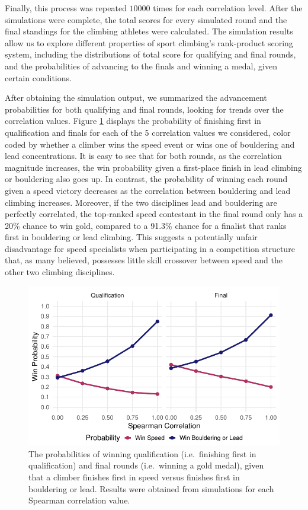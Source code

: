 \documentclass[letterpaper, inpress]{jds} %
\begin{document}
Finally, this process was repeated \(10000\) times for each correlation
level. After the simulations were complete, the total scores for every
simulated round and the final standings for the climbing athletes were
calculated. The simulation results allow us to explore different
properties of sport climbing's rank-product scoring system, including
the distributions of total score for qualifying and final rounds, and
the probabilities of advancing to the finals and winning a medal, given
certain conditions.

After obtaining the simulation output, we summarized the advancement
probabilities for both qualifying and final rounds, looking for trends
over the correlation values. Figure \ref{fig:fig1} displays the
probability of finishing first in qualification and finals for each of
the 5 correlation values we considered, color coded by whether a climber
wins the speed event or wins one of bouldering and lead concentrations.
It is easy to see that for both rounds, as the correlation magnitude
increases, the win probability given a first-place finish in lead
climbing or bouldering also goes up. In contrast, the probability of
winning each round given a speed victory decreases as the correlation
between bouldering and lead climbing increases. Moreover, if the two
disciplines lead and bouldering are perfectly correlated, the top-ranked
speed contestant in the final round only has a 20\% chance to win gold,
compared to a 91.3\% chance for a finalist that ranks first in
bouldering or lead climbing. This suggests a potentially unfair
disadvantage for speed specialists when participating in a competition
structure that, as many believed, possesses little skill crossover
between speed and the other two climbing disciplines.

\begin{figure}
\centering
\includegraphics{corr-1.pdf}
\caption{\label{fig:fig1}The probabilities of winning qualification
(i.e.~finishing first in qualification) and final rounds (i.e.~winning a
gold medal), given that a climber finishes first in speed versus
finishes first in bouldering or lead. Results were obtained from
simulations for each Spearman correlation value.}
\end{figure}
\end{document}
